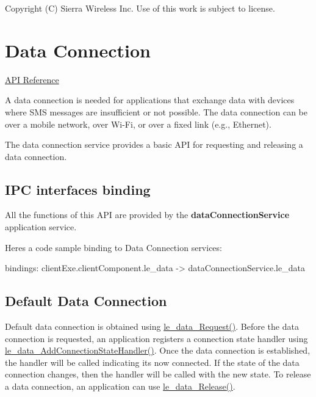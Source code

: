 Copyright (C) Sierra Wireless Inc. Use of this work is subject to license. \hypertarget{c_le_data}{}\section{Data Connection}\label{c_le_data}
\hyperlink{le__data__interface_8h}{A\+P\+I Reference}





A data connection is needed for applications that exchange data with devices where S\+M\+S messages are insufficient or not possible. The data connection can be over a mobile network, over Wi-\/\+Fi, or over a fixed link (e.\+g., Ethernet).

The data connection service provides a basic A\+P\+I for requesting and releasing a data connection.\hypertarget{c_le_data_le_data_binding}{}\subsection{I\+P\+C interfaces binding}\label{c_le_data_le_data_binding}
All the functions of this A\+P\+I are provided by the {\bfseries data\+Connection\+Service} application service.

Here\textquotesingle{}s a code sample binding to Data Connection services\+: \begin{DoxyVerb} bindings:
 {
    clientExe.clientComponent.le_data -> dataConnectionService.le_data
 }\end{DoxyVerb}
\hypertarget{c_le_data_c_le_data_default}{}\subsection{Default Data Connection}\label{c_le_data_c_le_data_default}
Default data connection is obtained using \hyperlink{le__data__interface_8h_afb9db0acdd98620cb0cd303bee8a817c}{le\+\_\+data\+\_\+\+Request()}. Before the data connection is requested, an application registers a connection state handler using \hyperlink{le__data__interface_8h_aebd3fc58774ed3f5a11f70d2317837dd}{le\+\_\+data\+\_\+\+Add\+Connection\+State\+Handler()}. Once the data connection is established, the handler will be called indicating it\textquotesingle{}s now connected. If the state of the data connection changes, then the handler will be called with the new state. To release a data connection, an application can use \hyperlink{le__data__interface_8h_a1dc7cd8faed6b1ee02ea947cf02b8ee7}{le\+\_\+data\+\_\+\+Release()}.

